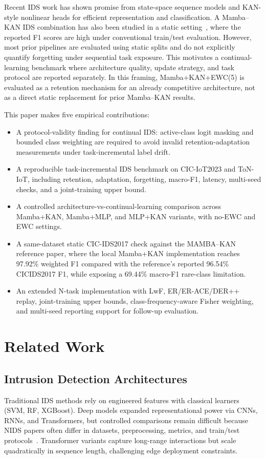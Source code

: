 \documentclass[a4paper,fleqn]{cas-dc}
\begin{document}
Recent IDS work has shown promise from state-space sequence models and KAN-style nonlinear heads for efficient representation and classification. A Mamba--KAN IDS combination has also been studied in a static setting~\cite{zhao2025}, where the reported F1 scores are high under conventional train/test evaluation. However, most prior pipelines are evaluated using static splits and do not explicitly quantify forgetting under sequential task exposure. This motivates a continual-learning benchmark where architecture quality, update strategy, and task protocol are reported separately. In this framing, Mamba+KAN+EWC(5) is evaluated as a retention mechanism for an already competitive architecture, not as a direct static replacement for prior Mamba--KAN results.

This paper makes five empirical contributions:
\begin{itemize}
\item A protocol-validity finding for continual IDS: active-class logit masking and bounded class weighting are required to avoid invalid retention-adaptation measurements under task-incremental label drift.
\item A reproducible task-incremental IDS benchmark on CIC-IoT2023 and ToN-IoT, including retention, adaptation, forgetting, macro-F1, latency, multi-seed checks, and a joint-training upper bound.
\item A controlled architecture-vs-continual-learning comparison across Mamba+KAN, Mamba+MLP, and MLP+KAN variants, with no-EWC and EWC settings.
\item A same-dataset static CIC-IDS2017 check against the MAMBA--KAN reference paper, where the local Mamba+KAN implementation reaches 97.92\% weighted F1 compared with the reference's reported 96.54\% CICIDS2017 F1, while exposing a 69.44\% macro-F1 rare-class limitation.
\item An extended N-task implementation with LwF, ER/ER-ACE/DER++ replay, joint-training upper bounds, class-frequency-aware Fisher weighting, and multi-seed reporting support for follow-up evaluation.
\end{itemize}

\section{Related Work}
\subsection{Intrusion Detection Architectures}
Traditional IDS methods rely on engineered features with classical learners (SVM, RF, XGBoost). Deep models expanded representational power via CNNs, RNNs, and Transformers, but controlled comparisons remain difficult because NIDS papers often differ in datasets, preprocessing, metrics, and train/test protocols~\cite{gamage2020survey}. Transformer variants capture long-range interactions but scale quadratically in sequence length, challenging edge deployment constraints.
\end{document}
